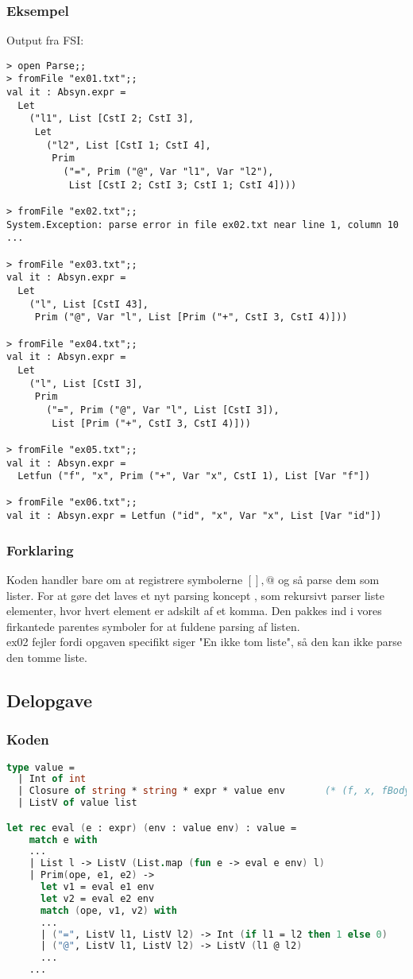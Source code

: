 \subsubsection{Eksempel}
Output fra FSI:
\begin{lstlisting}
> open Parse;;
> fromFile "ex01.txt";;
val it : Absyn.expr =
  Let
    ("l1", List [CstI 2; CstI 3],
     Let
       ("l2", List [CstI 1; CstI 4],
        Prim
          ("=", Prim ("@", Var "l1", Var "l2"),
           List [CstI 2; CstI 3; CstI 1; CstI 4])))

> fromFile "ex02.txt";;
System.Exception: parse error in file ex02.txt near line 1, column 10
...

> fromFile "ex03.txt";;
val it : Absyn.expr =
  Let
    ("l", List [CstI 43],
     Prim ("@", Var "l", List [Prim ("+", CstI 3, CstI 4)]))

> fromFile "ex04.txt";;
val it : Absyn.expr =
  Let
    ("l", List [CstI 3],
     Prim
       ("=", Prim ("@", Var "l", List [CstI 3]),
        List [Prim ("+", CstI 3, CstI 4)]))

> fromFile "ex05.txt";;
val it : Absyn.expr =
  Letfun ("f", "x", Prim ("+", Var "x", CstI 1), List [Var "f"])

> fromFile "ex06.txt";;
val it : Absyn.expr = Letfun ("id", "x", Var "x", List [Var "id"])
\end{lstlisting}

\subsubsection{Forklaring}
Koden handler bare om at registrere symbolerne $[],@$ og så parse dem som lister. For at gøre det laves et nyt parsing koncept , som rekursivt parser liste elementer, hvor hvert element er adskilt af et komma. Den pakkes ind i vores firkantede parentes symboler for at fuldene parsing af listen.\\

ex02 fejler fordi opgaven specifikt siger "En ikke tom liste", så den kan ikke parse den tomme liste.

\subsection{Delopgave }\label{ass:4-2}
\subsubsection{Koden}
\begin{lstlisting}[language=fsharp]
type value = 
  | Int of int
  | Closure of string * string * expr * value env       (* (f, x, fBody, fDeclEnv) *)
  | ListV of value list

let rec eval (e : expr) (env : value env) : value =
    match e with
    ...
    | List l -> ListV (List.map (fun e -> eval e env) l) 
    | Prim(ope, e1, e2) -> 
      let v1 = eval e1 env
      let v2 = eval e2 env
      match (ope, v1, v2) with
      ...
      | ("=", ListV l1, ListV l2) -> Int (if l1 = l2 then 1 else 0)
      | ("@", ListV l1, ListV l2) -> ListV (l1 @ l2)
      ...
    ...
\end{lstlisting}

